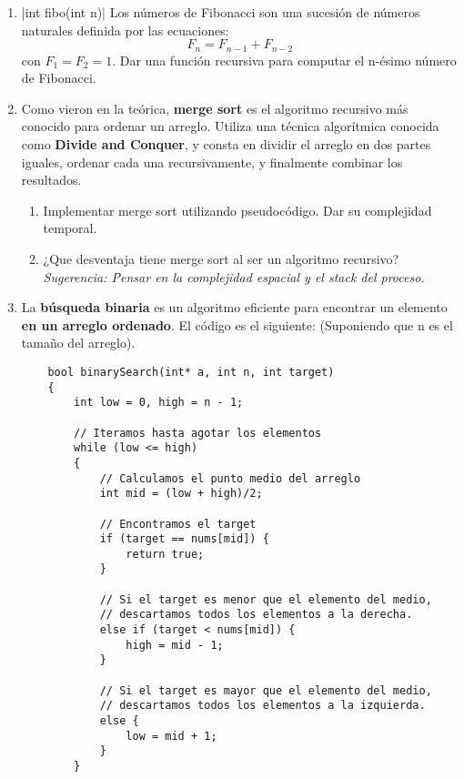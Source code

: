\documentclass[titlepage,oneside]{book}
\begin{document}
    \begin{enumerate}
    
        \item{}|int fibo(int n)|
        Los números de Fibonacci son una sucesión de números naturales definida por las ecuaciones:
        $$F_n = F_{n-1} + F_{n-2}$$ con $F_1 = F_2 = 1$. Dar una función recursiva para computar el n-ésimo número de Fibonacci.

        \item Como vieron en la teórica, \textbf{merge sort} es el algoritmo recursivo más conocido para ordenar un arreglo. Utiliza una técnica algorítmica conocida como \textbf{Divide and Conquer}, y consta en dividir el arreglo en dos partes iguales, ordenar cada una recursivamente, y finalmente combinar los resultados.
        \begin{enumerate}
            \item Implementar merge sort utilizando pseudocódigo. Dar su complejidad temporal.
            \item ¿Que desventaja tiene merge sort al ser un algoritmo recursivo? \newline\textit{Sugerencia: Pensar en la complejidad espacial y el stack del proceso.}
        \end{enumerate}

        \item La \textbf{búsqueda binaria} es un algoritmo eficiente para encontrar un elemento \textbf{en un arreglo ordenado}. El código es el siguiente: (Suponiendo que n es el tamaño del arreglo).

            \begin{verbatim}
    bool binarySearch(int* a, int n, int target)
    {
        int low = 0, high = n - 1;
        
        // Iteramos hasta agotar los elementos
        while (low <= high)
        {
            // Calculamos el punto medio del arreglo
            int mid = (low + high)/2;
            
            // Encontramos el target
            if (target == nums[mid]) {
                return true;
            }
     
            // Si el target es menor que el elemento del medio, 
            // descartamos todos los elementos a la derecha.
            else if (target < nums[mid]) {
                high = mid - 1;
            }
     
            // Si el target es mayor que el elemento del medio, 
            // descartamos todos los elementos a la izquierda.
            else {
                low = mid + 1;
            }
        }
 

\end{verbatim}
\end{enumerate}
\end{document}
